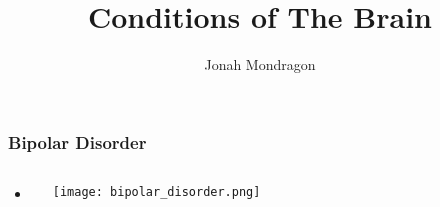\documentclass{beamer}
\title{Conditions of The Brain}
\institute{English I Period 6}
\author{Jonah Mondragon}
\begin{document}
\maketitle

\begin{frame}
	\frametitle{Bipolar Disorder}
    \begin{columns}
        \begin{itemize}
            \item{}
        \end{itemize}
        \texttt{[image: bipolar\_disorder.png]}
    \end{columns}
\end{frame}

\begin{frame}

\end{frame}
\end{document}
